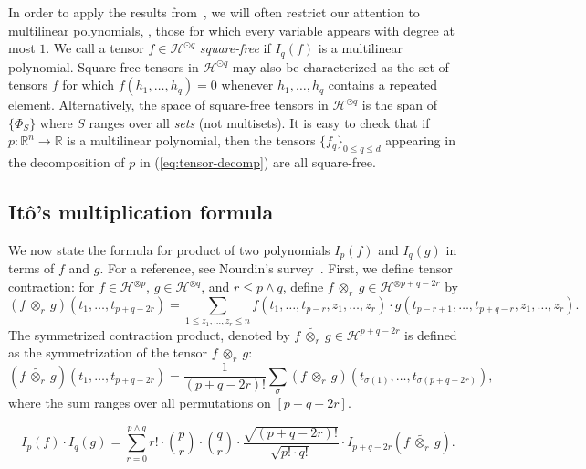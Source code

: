 \documentclass{toc}
\begin{document}
In order to apply the results from~\cite{DS14}, we will often restrict our
attention to multilinear polynomials, \ie, those for which every variable
appears with degree at most $1$. We call a tensor $f \in \mathcal{H}^{\odot q}$
\emph{square-free} if $I_q(f)$ is a multilinear polynomial. Square-free
tensors in $\mathcal{H}^{\odot q}$ may also be characterized as the set of tensors $f$
for which $f(h_1, \dots, h_q) = 0$ whenever $h_1, \dots, h_q$ contains a repeated element.
Alternatively, the space of square-free tensors in $\mathcal{H}^{\odot q}$ is the span
of $\{\Phi_S\}$ where $S$ ranges over all \emph{sets} (not multisets).
It is easy to check that if $p: \mathbb{R}^n \rightarrow \mathbb{R}$ is a multilinear polynomial, 
then the tensors $\{f_q\}_{0 \le q\le d}$ appearing in the decomposition of $p$ in (\ref{eq:tensor-decomp}) are all square-free.

\subsection{It\^{o}'s multiplication formula}

We now state the formula for product of
two polynomials $I_p(f)$ and $I_q(g)$ in terms of $f$ and $g$. For a reference,
see Nourdin's  survey~\cite{Nourdin2013}. First, we define tensor contraction:
for $f \in \mathcal{H}^{\otimes p}$, $g \in \mathcal{H}^{\otimes q}$, and
$r \le p \wedge q$, define $f \ {\otimes}_r \ g \in \mathcal{H}^{\otimes p+q-2r}$ by
\[
    (f\ {\otimes}_r\ g) (t_1, \ldots, t_{p+q-2r})= \sum_{1 \le z_1, \ldots, z_r \le n} f(t_1, \ldots, t_{p-r}, z_{1}, \ldots, z_r) \cdot g(t_{p-r+1}, \ldots, t_{p+q-r}, z_{1}, \ldots, z_r).
\]
The symmetrized contraction product, denoted by $f \ \widetilde{{\otimes}_r} \
g \in \mathcal{H}^{p+q-2r}$ is defined as the symmetrization of the tensor $f \
{\otimes}_r \ g$:
\[
    (f \ \widetilde{\otimes_r} \ g)(t_1, \dots, t_{p+q-2r}) = \frac{1}{(p+q-2r)!} \sum_\sigma (f \ \otimes_r\ g)(t_{\sigma(1)}, \dots, t_{\sigma(p+q-2r)}),
\]
where the sum ranges over all permutations on $[p+q-2r]$.

\begin{proposition}\label{prop:Ito}
\[
I_p(f) \cdot I_q(g) = \sum_{r=0}^{p \wedge q} r! \cdot \binom{p}{r} \cdot \binom{q}{r}  \cdot \frac{\sqrt{(p+q-2r)!}}{\sqrt{p! \cdot q!}}\cdot I_{p+q-2r} (f \ \widetilde{{\otimes}_r} \ g). 
\]
\end{proposition}
\end{document}
